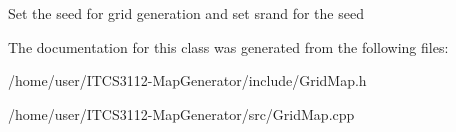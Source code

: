 Set the seed for grid generation and set srand for the seed 

The documentation for this class was generated from the following files\+:\begin{DoxyCompactItemize}
\item 
/home/user/\+I\+T\+C\+S3112-\/\+Map\+Generator/include/Grid\+Map.\+h\item 
/home/user/\+I\+T\+C\+S3112-\/\+Map\+Generator/src/Grid\+Map.\+cpp\end{DoxyCompactItemize}
